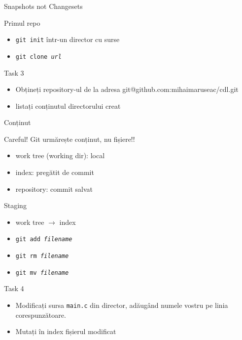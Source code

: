 \documentclass{beamer}
\begin{document}
\begin{frame}{Snapshots not Changesets}
\end{frame}

\begin{frame}{Primul repo}
  \begin{itemize}
    \item \texttt{git init} într-un director cu surse
    \item \texttt{git clone \textit{url}}
  \end{itemize}
  \pause
  \begin{alertblock}{Task 3}
    \begin{itemize}
      \item Obțineți repository-ul de la adresa
      git@github.com:mihaimaruseac/cdl.git
      \item listați conținutul directorului creat
    \end{itemize}
  \end{alertblock}
\end{frame}

\begin{frame}[label=Content]{Conținut}
  \begin{alertblock}{Careful!}
    Git urmărește conținut, nu fișiere!!
  \end{alertblock}
  \begin{itemize}
    \item work tree (working dir): local
    \item index: pregătit de commit
    \item repository: commit salvat
  \end{itemize}
\end{frame}

\begin{frame}{Staging}
  \begin{itemize}
    \item work tree $\rightarrow$ index
    \item \texttt{git add \textit{filename}}
    \item \texttt{git rm \textit{filename}}
    \item \texttt{git mv \textit{filename}}
  \end{itemize}
  \pause
  \begin{alertblock}{Task 4}
    \begin{itemize}
      \item Modificați sursa \texttt{main.c} din director, adăugând numele vostru pe linia
      corespunzătoare.
      \item Mutați în index fișierul modificat
    \end{itemize}
  \end{alertblock}
\end{frame}
\end{document}

